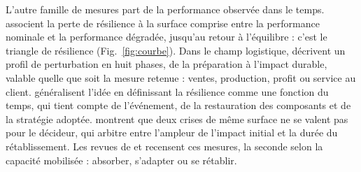 L'autre famille de mesures part de la performance observée dans le temps. \citet{bruneau2003} associent la perte de résilience à la surface comprise entre la performance nominale et la performance dégradée, jusqu'au retour à l'équilibre : c'est le triangle de résilience (Fig.~\ref{fig:courbe}). Dans le champ logistique, \citet{sheffirice2005} décrivent un profil de perturbation en huit phases, de la préparation à l'impact durable, valable quelle que soit la mesure retenue : ventes, production, profit ou service au client. \citet{henry2012} généralisent l'idée en définissant la résilience comme une fonction du temps, qui tient compte de l'événement, de la restauration des composants et de la stratégie adoptée. \citet{zobel2011} montrent que deux crises de même surface ne se valent pas pour le décideur, qui arbitre entre l'ampleur de l'impact initial et la durée du rétablissement. Les revues de \citet{hosseini2016} et \citet{hosseini2019tre} recensent ces mesures, la seconde selon la capacité mobilisée : absorber, s'adapter ou se rétablir.

